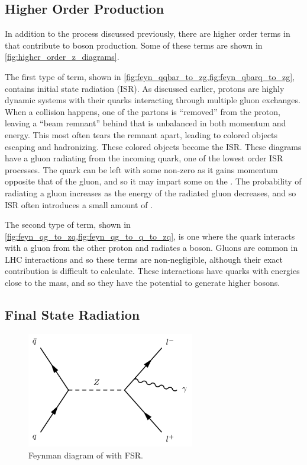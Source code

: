 \subsection{Higher Order Production}
\label{ssec:higher_order}

In addition to the \DrellYan process discussed previously, there are higher
order terms in \alphastrong that contribute to \Z boson production. Some of
these terms are shown in \cref{fig:higher_order_z_diagrams}.

The first type of term, shown in
\cref{fig:feyn_qqbar_to_zg,fig:feyn_qbarq_to_zg}, contains initial state
radiation (ISR). As discussed earlier, protons are highly dynamic systems with
their quarks interacting through multiple gluon exchanges. When a collision
happens, one of the partons is ``removed'' from the proton, leaving a ``beam
remnant'' behind that is unbalanced in both momentum and energy. This most
often tears the remnant apart, leading to colored objects escaping and
hadronizing. These colored objects become the ISR. These diagrams have a gluon
radiating from the incoming quark, one of the lowest order ISR processes. The
quark can be left with some non-zero \pt as it gains momentum opposite that of
the gluon, and so it may impart some \bosonpt on the \Z. The probability of
radiating a gluon increases as the energy of the radiated gluon decreases, and
so ISR often introduces a small amount of \bosonpt.

The second type of term, shown in
\cref{fig:feyn_qg_to_zq,fig:feyn_qg_to_q_to_zq}, is one where the quark
interacts with a gluon from the other proton and radiates a \Z boson. Gluons
are common in LHC interactions and so these terms are non-negligible, although
their exact contribution is difficult to calculate. These interactions have
quarks with energies close to the \Z mass, and so they have the potential to
generate higher \pt \Z bosons.



\subsection{Final State Radiation}
\label{sec:electron_dressing}

\begin{figure}[!htb]
    \centering
    \includegraphics[width=0.65\textwidth]{figures/fsr.pdf}
    \caption{
        Feynman diagram of \Ztoll with FSR.
    }
    \label{fig:fsr_diagram}
\end{figure}


